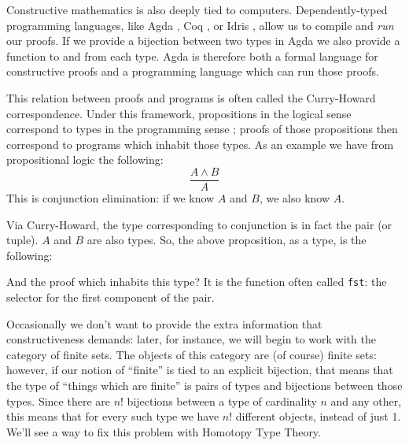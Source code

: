 Constructive mathematics is also deeply tied to computers.
Dependently-typed programming languages, like Agda
\citep{norellDependentlyTypedProgramming2008}, Coq
\citep{thecoqdevelopmentteamCoqProofAssistant2020}, or Idris
\citep{bradyIdrisGeneralpurposeDependently2013}, allow us to compile and
\emph{run} our proofs.
If we provide a bijection between two types in Agda we also provide a function
to and from each type.
Agda is therefore both a formal language for constructive proofs and a
programming language which can run those proofs.

This relation between proofs and programs is often called the Curry-Howard
correspondence.
Under this framework, propositions in the logical sense correspond to types in
the programming sense \citep{wadlerPropositionsTypes2015}; proofs of those
propositions then correspond to programs which inhabit those types.
As an example we have from propositional logic the following:
\begin{equation*}
  \frac{A \wedge B}{A}
\end{equation*}
This is conjunction elimination: if we know \(A\) and \(B\), we also know \(A\).

Via Curry-Howard, the type corresponding to conjunction is in fact the pair (or
tuple).
\(A\) and \(B\) are also types.
So, the above proposition, as a type, is the following:
\begin{agdalisting*}
   \vspace{-\baselineskip}
\end{agdalisting*}
And the proof which inhabits this type?
It is the function often called \verb+fst+: the selector for the first component
of the pair.
\begin{agdalisting*}
   \vspace{-\baselineskip}
\end{agdalisting*}


Occasionally we don't want to provide the extra information that
constructiveness demands: later, for instance, we will begin to work with the
category of finite sets.
The objects of this category are (of course) finite sets: however, if our notion
of ``finite'' is tied to an explicit bijection, that means that the type of
``things which are finite'' is pairs of types and bijections between those
types. 
Since there are \(n!\) bijections between a type of cardinality \(n\) and any
other, this means that for every such type we have \(n!\) different objects,
instead of just 1.
We'll see a way to fix this problem with Homotopy Type Theory.

